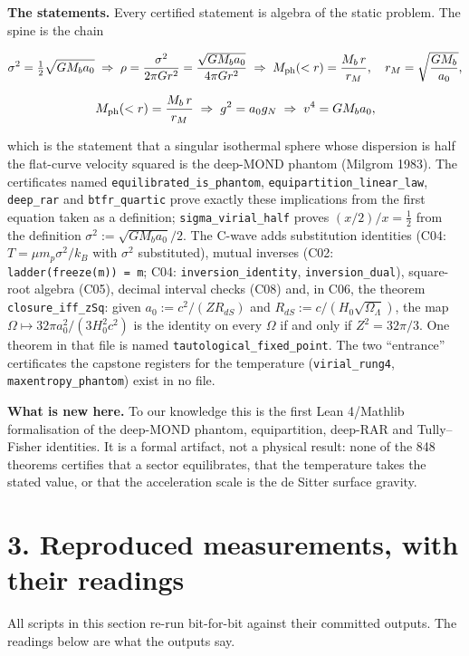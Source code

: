\documentclass[
  11pt,
]{article}
\newcounter{none} %
\begin{document}
\textbf{The statements.} Every certified statement is algebra of the
static problem. The spine is the chain

\[\sigma^2 = \tfrac12\sqrt{G M_b a_0}
\;\Rightarrow\;
\rho = \frac{\sigma^2}{2\pi G r^2} = \frac{\sqrt{G M_b a_0}}{4\pi G r^2}
\;\Rightarrow\;
M_{\rm ph}(<r) = \frac{M_b\, r}{r_M},\quad r_M = \sqrt{\frac{G M_b}{a_0}},\]

\[M_{\rm ph}(<r) = \frac{M_b\, r}{r_M}
\;\Rightarrow\;
g^2 = a_0 g_N
\;\Rightarrow\;
v^4 = G M_b a_0,\]

which is the statement that a singular isothermal sphere whose
dispersion is half the flat-curve velocity squared is the deep-MOND
phantom (Milgrom 1983). The certificates named
\texttt{equilibrated\_is\_phantom}, \texttt{equipartition\_linear\_law},
\texttt{deep\_rar} and \texttt{btfr\_quartic} prove exactly these
implications from the first equation taken as a definition;
\texttt{sigma\_virial\_half} proves \((x/2)/x = \tfrac12\) from the
definition \(\sigma^2 := \sqrt{G M_b a_0}/2\). The C-wave adds
substitution identities (C04: \(T = \mu m_p \sigma^2/k_B\) with
\(\sigma^2\) substituted), mutual inverses (C02:
\texttt{ladder(freeze(m))\ =\ m}; C04: \texttt{inversion\_identity},
\texttt{inversion\_dual}), square-root algebra (C05), decimal interval
checks (C08) and, in C06, the theorem \texttt{closure\_iff\_zSq}: given
\(a_0 := c^2/(Z R_{dS})\) and
\(R_{dS} := c/(H_0\sqrt{\Omega_\Lambda})\), the map
\(\Omega \mapsto 32\pi a_0^2/(3H_0^2c^2)\) is the identity on every
\(\Omega\) if and only if \(Z^2 = 32\pi/3\). One theorem in that file is
named \texttt{tautological\_fixed\_point}. The two ``entrance''
certificates the capstone registers for the temperature
(\texttt{virial\_rung4}, \texttt{maxentropy\_phantom}) exist in no file.

\textbf{What is new here.} To our knowledge this is the first Lean
4/Mathlib formalisation of the deep-MOND phantom, equipartition,
deep-RAR and Tully--Fisher identities. It is a formal artifact, not a
physical result: none of the 848 theorems certifies that a sector
equilibrates, that the temperature takes the stated value, or that the
acceleration scale is the de Sitter surface gravity.

\section{3. Reproduced measurements, with their
readings}\label{reproduced-measurements-with-their-readings}

All scripts in this section re-run bit-for-bit against their committed
outputs. The readings below are what the outputs say.
\end{document}
